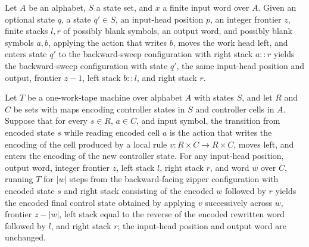 \begin{lemma}
\label{Turing.FinTM.sweepRevCfg_left}
\leanok
{}
Let $A$ be an alphabet, $S$ a state set, and $x$ a finite input word over $A$. Given an
optional state $q$, a state $q'\in S$, an input-head position $p$, an integer frontier
$z$, finite stacks $l,r$ of possibly blank symbols, an output word, and possibly blank
symbols $a,b$, applying the action that writes $b$, moves the work head left, and enters
state $q'$ to the backward-sweep configuration with right stack $a::r$ yields the
backward-sweep configuration with state $q'$, the same input-head position and output,
frontier $z-1$, left stack $b::l$, and right stack $r$.
\end{lemma}

\begin{lemma}
\label{Turing.FinTM.sweep_run_reverse}
\leanok
{}
Let $T$ be a one-work-tape machine over alphabet $A$ with states $S$, and let $R$ and
$C$ be sets with maps encoding controller states in $S$ and controller cells in $A$.
Suppose that for every $s\in R$, $a\in C$, and input symbol, the transition from encoded
state $s$ while reading encoded cell $a$ is the action that writes the encoding of the
cell produced by a local rule $v:R\times C\to R\times C$, moves left, and enters the
encoding of the new controller state. For any input-head position, output word, integer
frontier $z$, left stack $l$, right stack $r$, and word $w$ over $C$, running $T$ for
$|w|$ steps from the backward-facing zipper configuration with encoded state $s$ and
right stack consisting of the encoded $w$ followed by $r$ yields the encoded final
control state obtained by applying $v$ successively across $w$, frontier $z-|w|$, left
stack equal to the reverse of the encoded rewritten word followed by $l$, and right
stack $r$; the input-head position and output word are unchanged.
\end{lemma}

